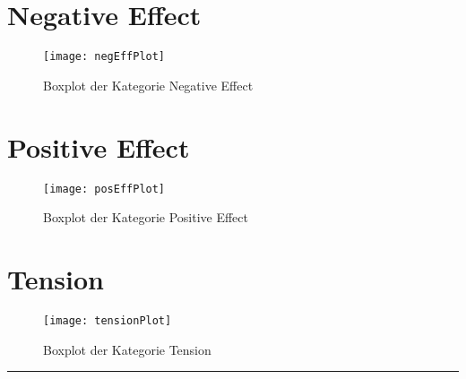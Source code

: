 \section{Negative Effect}
\begin{figure}[h!tb]
	\centering
	\texttt{[image: negEffPlot]}
	\caption{Boxplot der Kategorie Negative Effect\label{fig:farbskala}}
\end{figure}

\section{Positive Effect}
\begin{figure}[htb]
	\centering
	\texttt{[image: posEffPlot]}
	\caption{Boxplot der Kategorie Positive Effect\label{fig:farbskala}}
\end{figure}

\section{Tension}
\begin{figure}[htb]
	\centering
	\texttt{[image: tensionPlot]}
	\caption{Boxplot der Kategorie Tension\label{fig:farbskala}}
\end{figure}

\hfil\rule{0.4\textwidth}{0.4pt}